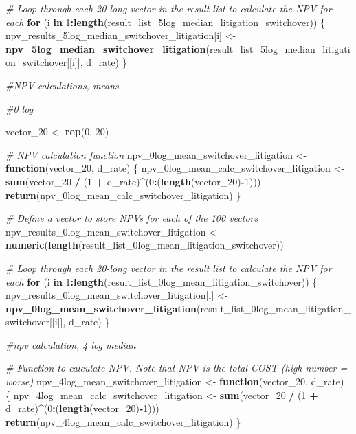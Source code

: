 \documentclass[
]{article}
\newenvironment{Shaded}{\begin{snugshade}}{\end{snugshade}}
\newcommand{\CommentTok}[1]{\textcolor[rgb]{0.56,0.35,0.01}{\textit{#1}}}
\newcommand{\ControlFlowTok}[1]{\textcolor[rgb]{0.13,0.29,0.53}{\textbf{#1}}}
\newcommand{\DecValTok}[1]{\textcolor[rgb]{0.00,0.00,0.81}{#1}}
\newcommand{\FunctionTok}[1]{\textcolor[rgb]{0.13,0.29,0.53}{\textbf{#1}}}
\newcommand{\NormalTok}[1]{#1}
\newcommand{\OtherTok}[1]{\textcolor[rgb]{0.56,0.35,0.01}{#1}}
\newcommand{\SpecialCharTok}[1]{\textcolor[rgb]{0.81,0.36,0.00}{\textbf{#1}}}
\begin{document}
\begin{Shaded}
\begin{Highlighting}[]
\CommentTok{\# Loop through each 20{-}long vector in the result list to calculate the NPV for each}
\ControlFlowTok{for}\NormalTok{ (i }\ControlFlowTok{in} \DecValTok{1}\SpecialCharTok{:}\FunctionTok{length}\NormalTok{(result\_list\_5log\_median\_litigation\_switchover)) \{}
\NormalTok{  npv\_results\_5log\_median\_switchover\_litigation[i] }\OtherTok{\textless{}{-}} \FunctionTok{npv\_5log\_median\_switchover\_litigation}\NormalTok{(result\_list\_5log\_median\_litigation\_switchover[[i]], d\_rate)}
\NormalTok{\}}


\CommentTok{\#NPV calculations, means}


\CommentTok{\#0 log }

\NormalTok{vector\_20 }\OtherTok{\textless{}{-}} \FunctionTok{rep}\NormalTok{(}\DecValTok{0}\NormalTok{, }\DecValTok{20}\NormalTok{)}

\CommentTok{\# NPV calculation function}
\NormalTok{npv\_0log\_mean\_switchover\_litigation }\OtherTok{\textless{}{-}} \ControlFlowTok{function}\NormalTok{(vector\_20, d\_rate) \{}
\NormalTok{  npv\_0log\_mean\_calc\_switchover\_litigation }\OtherTok{\textless{}{-}} \FunctionTok{sum}\NormalTok{(vector\_20 }\SpecialCharTok{/}\NormalTok{ (}\DecValTok{1} \SpecialCharTok{+}\NormalTok{ d\_rate)}\SpecialCharTok{\^{}}\NormalTok{(}\DecValTok{0}\SpecialCharTok{:}\NormalTok{(}\FunctionTok{length}\NormalTok{(vector\_20)}\SpecialCharTok{{-}}\DecValTok{1}\NormalTok{)))}
  \FunctionTok{return}\NormalTok{(npv\_0log\_mean\_calc\_switchover\_litigation)}
\NormalTok{\}}

\CommentTok{\# Define a vector to store NPVs for each of the 100 vectors}
\NormalTok{npv\_results\_0log\_mean\_switchover\_litigation }\OtherTok{\textless{}{-}} \FunctionTok{numeric}\NormalTok{(}\FunctionTok{length}\NormalTok{(result\_list\_0log\_mean\_litigation\_switchover))}

\CommentTok{\# Loop through each 20{-}long vector in the result list to calculate the NPV for each}
\ControlFlowTok{for}\NormalTok{ (i }\ControlFlowTok{in} \DecValTok{1}\SpecialCharTok{:}\FunctionTok{length}\NormalTok{(result\_list\_0log\_mean\_litigation\_switchover)) \{}
\NormalTok{  npv\_results\_0log\_mean\_switchover\_litigation[i] }\OtherTok{\textless{}{-}} \FunctionTok{npv\_0log\_mean\_switchover\_litigation}\NormalTok{(result\_list\_0log\_mean\_litigation\_switchover[[i]], d\_rate)}
\NormalTok{\}}


\CommentTok{\#npv calculation, 4 log median}


\CommentTok{\# Function to calculate NPV. Note that NPV is the total COST (high number = worse)}
\NormalTok{npv\_4log\_mean\_switchover\_litigation }\OtherTok{\textless{}{-}} \ControlFlowTok{function}\NormalTok{(vector\_20, d\_rate) \{}
\NormalTok{  npv\_4log\_mean\_calc\_switchover\_litigation }\OtherTok{\textless{}{-}} \FunctionTok{sum}\NormalTok{(vector\_20 }\SpecialCharTok{/}\NormalTok{ (}\DecValTok{1} \SpecialCharTok{+}\NormalTok{ d\_rate)}\SpecialCharTok{\^{}}\NormalTok{(}\DecValTok{0}\SpecialCharTok{:}\NormalTok{(}\FunctionTok{length}\NormalTok{(vector\_20)}\SpecialCharTok{{-}}\DecValTok{1}\NormalTok{)))}
  \FunctionTok{return}\NormalTok{(npv\_4log\_mean\_calc\_switchover\_litigation)}
\NormalTok{\}}


\end{Highlighting}
\end{Shaded}
\end{document}

